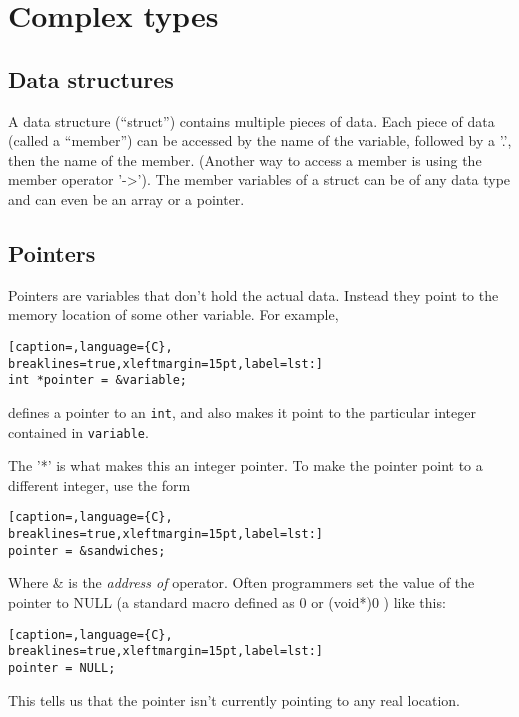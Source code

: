 \section{Complex types}\label{Complex_types}
\subsection{Data structures}
A data structure (``struct'') contains multiple pieces of data.  Each piece of
data (called a ``member'') can be accessed by the name of the variable,
followed by a '.', then the name of the member.  (Another way to access a
member is using the member operator '-\textgreater{}').  The member variables
of a struct can be of any data type and can even be an array or a pointer.

\subsection{Pointers}
Pointers are variables that don't hold the actual data. Instead they point to
the memory location of some other variable.  For example,
\lstset{basicstyle=\scriptsize, numbers=left, captionpos=b, tabsize=4}
\begin{lstlisting}[caption=,language={C},
breaklines=true,xleftmargin=15pt,label=lst:]
int *pointer = &variable;
\end{lstlisting}

defines a pointer to an \texttt{int}, and also makes it point to the particular
integer contained in \texttt{variable}.

The '*' is what makes this an integer pointer.  To make the pointer point to a
different integer, use the form
\lstset{basicstyle=\scriptsize, numbers=left, captionpos=b, tabsize=4}
\begin{lstlisting}[caption=,language={C},
breaklines=true,xleftmargin=15pt,label=lst:]
pointer = &sandwiches;
\end{lstlisting}

Where \& is the \emph{address of} operator.  Often programmers set the value of
the pointer to NULL (a standard macro defined as 0 or (void*)0 ) like this:
\lstset{basicstyle=\scriptsize, numbers=left, captionpos=b, tabsize=4}
\begin{lstlisting}[caption=,language={C},
breaklines=true,xleftmargin=15pt,label=lst:]
pointer = NULL;
\end{lstlisting}

This tells us that the pointer isn't currently pointing to any real location.

